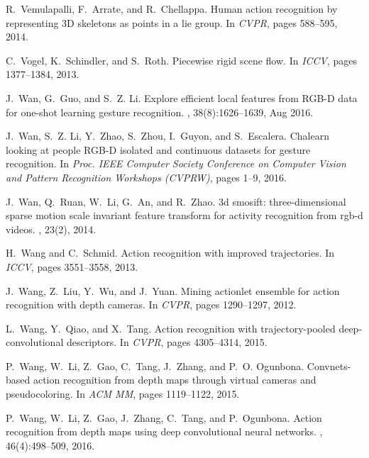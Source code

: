 \documentclass[10pt,twocolumn,letterpaper]{article}
\begin{document}
\begin{thebibliography}{10}
R.~Vemulapalli, F.~Arrate, and R.~Chellappa.
\newblock Human action recognition by representing {3D} skeletons as points in
  a lie group.
\newblock In {\em CVPR}, pages 588--595, 2014.

C.~Vogel, K.~Schindler, and S.~Roth.
\newblock Piecewise rigid scene flow.
\newblock In {\em ICCV}, pages 1377--1384, 2013.

J.~Wan, G.~Guo, and S.~Z. Li.
\newblock Explore efficient local features from {RGB-D} data for one-shot
  learning gesture recognition.
,
  38(8):1626--1639, Aug 2016.

J.~Wan, S.~Z. Li, Y.~Zhao, S.~Zhou, I.~Guyon, and S.~Escalera.
\newblock Chalearn looking at people {RGB-D} isolated and continuous datasets
  for gesture recognition.
\newblock In {\em Proc. IEEE Computer Society Conference on Computer Vision and
  Pattern Recognition Workshops (CVPRW)}, pages 1--9, 2016.

J.~Wan, Q.~Ruan, W.~Li, G.~An, and R.~Zhao.
\newblock 3d smosift: three-dimensional sparse motion scale invariant feature
  transform for activity recognition from rgb-d videos.
, 23(2), 2014.

H.~Wang and C.~Schmid.
\newblock Action recognition with improved trajectories.
\newblock In {\em ICCV}, pages 3551--3558, 2013.

J.~Wang, Z.~Liu, Y.~Wu, and J.~Yuan.
\newblock Mining actionlet ensemble for action recognition with depth cameras.
\newblock In {\em CVPR}, pages 1290--1297, 2012.

L.~Wang, Y.~Qiao, and X.~Tang.
\newblock Action recognition with trajectory-pooled deep-convolutional
  descriptors.
\newblock In {\em CVPR}, pages 4305--4314, 2015.

P.~Wang, W.~Li, Z.~Gao, C.~Tang, J.~Zhang, and P.~O. Ogunbona.
\newblock Convnets-based action recognition from depth maps through virtual
  cameras and pseudocoloring.
\newblock In {\em ACM MM}, pages 1119--1122, 2015.

P.~Wang, W.~Li, Z.~Gao, J.~Zhang, C.~Tang, and P.~Ogunbona.
\newblock Action recognition from depth maps using deep convolutional neural
  networks.
, 46(4):498--509,
  2016.


\end{thebibliography}
\end{document}

